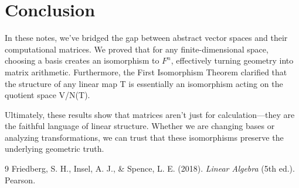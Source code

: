 \documentclass[12pt, a4paper]{article}
\theoremstyle{definition}
\theoremstyle{remark}
\begin{document}
\section{Conclusion}
In these notes, we’ve bridged the gap between abstract vector spaces and their computational matrices. We proved that for any finite-dimensional space, choosing a basis creates an isomorphism to $F^n$, effectively turning geometry into matrix arithmetic. Furthermore, the First Isomorphism Theorem clarified that the structure of any linear map T is essentially an isomorphism acting on the quotient space V/N(T).

Ultimately, these results show that matrices aren't just for calculation—they are the faithful language of linear structure. Whether we are changing bases or analyzing transformations, we can trust that these isomorphisms preserve the underlying geometric truth.

\begin{thebibliography}{9}
    Friedberg, S. H., Insel, A. J., \& Spence, L. E. (2018). \textit{Linear Algebra} (5th ed.). Pearson.
\end{thebibliography}
\end{document}
